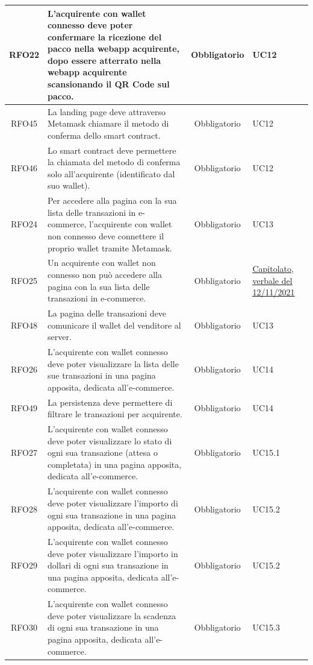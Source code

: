 \documentclass[a4paper, 12pt]{article}
\begin{document}
\begin{longtable}{|c|p{7cm}|c|p{4cm}|}
\hline
RFO22 & L'acquirente con wallet connesso deve poter confermare la ricezione del pacco nella webapp acquirente, dopo essere atterrato nella webapp acquirente scansionando il QR Code sul pacco. & Obbligatorio & UC12 \\
\hline
RFO45 & La landing page deve attraverso Metamask chiamare il metodo di conferma dello smart contract. & Obbligatorio & UC12 \\
\hline
RFO46 & Lo smart contract deve permettere la chiamata del metodo di conferma solo all'acquirente (identificato dal suo wallet). & Obbligatorio & UC12 \\
\hline
RFO24 & Per accedere alla pagina con la sua lista delle transazioni in e-commerce, l'acquirente con wallet non connesso deve connettere il proprio wallet tramite Metamask. & Obbligatorio & UC13 \\
\hline
RFO25 & Un acquirente con wallet non connesso non può accedere alla pagina con la sua lista delle transazioni in e-commerce. & Obbligatorio & \underline{\href{https://www.math.unipd.it/~tullio/IS-1/2021/Progetto/C2.pdf}{Capitolato}}, \underline{\href{https://github.com/iota97/WinningSoftwareSolution/blob/main/public/esterni/verbali/2021_11_12_E.pdf}{verbale del 12/11/2021}} \\
\hline
RFO48 & La pagina delle transazioni deve comunicare il wallet del venditore al server. & Obbligatorio & UC13\\
\hline
RFO26 & L'acquirente con wallet connesso deve poter visualizzare la lista delle sue transazioni in una pagina apposita, dedicata all'e-commerce. & Obbligatorio & UC14 \\
\hline
RFO49 & La persistenza deve permettere di filtrare le transazioni per acquirente. & Obbligatorio & UC14 \\
\hline
RFO27 & L'acquirente con wallet connesso deve poter visualizzare lo stato di ogni sua transazione (attesa o completata) in una pagina apposita, dedicata all'e-commerce. & Obbligatorio & UC15.1 \\
\hline
RFO28 & L'acquirente con wallet connesso deve poter visualizzare l'importo di ogni sua transazione in una pagina apposita, dedicata all'e-commerce. & Obbligatorio & UC15.2 \\
\hline
RFO29 & L'acquirente con wallet connesso deve poter visualizzare l'importo in dollari di ogni sua transazione in una pagina apposita, dedicata all'e-commerce. & Obbligatorio & UC15.2 \\
\hline
RFO30 & L'acquirente con wallet connesso deve poter visualizzare la scadenza di ogni sua transazione in una pagina apposita, dedicata all'e-commerce. & Obbligatorio & UC15.3 \\

\end{longtable}
\end{document}
